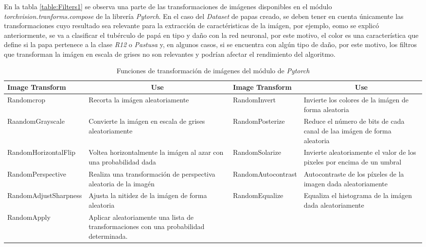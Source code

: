 			En la tabla \ref{table:Filters1} se observa una parte de las transformaciones de imágenes disponibles en el módulo \textit{torchvision.tranforms.compose} de la librería \textit{Pytorch}. En el caso del \textit{Dataset} de papas creado, se deben tener en cuenta únicamente las transformaciones cuyo resultado sea relevante para la extracción de caractéristicas de la imágen, por ejemplo, eomo se explicó anteriormente, se va a clasificar el tubérculo de papá en tipo y daño con la red neuronal, por este motivo, el color es una característica que define si la papa pertenece a la clase \textit{R12} o \textit{Pastusa} y, en algunos casos, si se encuentra con algún tipo de daño, por este motivo, los filtros que transforman la imágen en escala de grises no son relevantes y podrían afectar el rendimiento del algoritmo.
			
						
			\newpage
			
			\begin{table}[ht]
				\centering
				\begin{tabular}{|p{4cm}|p{4cm}|p{4cm}|p{4cm}|}
					\hline
					Image Transform       & \multicolumn{1}{c|}{Use}                                                               & Image Transform       & \multicolumn{1}{c|}{Use}                                                \\ \hline
					Randomcrop            & Recorta la imágen aleatoriamente                                                       & RandomInvert          & Invierte los colores de la imágen de forma aleatoria                    \\ \hline
					RaandomGrayscale      & Convierte la imágen en escala de grises aleatoriamente                                 & RandomPosterize       & Reduce el número de bits de cada canal de laa imágen de forma aleatoria \\ \hline
					RandomHorizontalFlip  & Voltea horizontalmente la imágen al azar con una probabilidad dada                     & RandomSolarize        & Invierte aleatoriamente el valor de los pixeles por encima de un umbral \\ \hline
					RandomPerspective     & Realiza una transformación de perspectiva aleatoria de la imagén                       & RandomAutocontrast    & Autocontraste de los píxeles de la imagen dada aleatoriamente           \\ \hline
					RandomAdjustSharpness & Ajusta la nitidez de la imágen de forma aleatoria                                      & RandomEqualize        & Equaliza el histograma de la imágen dada aleatoriamente                 \\ \hline
					RandomApply           & Aplicar aleatoriamente una lista de transformaciones con una probabilidad determinada. & \multicolumn{1}{l|}{} &                                                                         \\ \hline
				\end{tabular}
				\caption{Funciones de transformación de imágenes del módulo de \textit{Pytorch}}
			\end{table}





